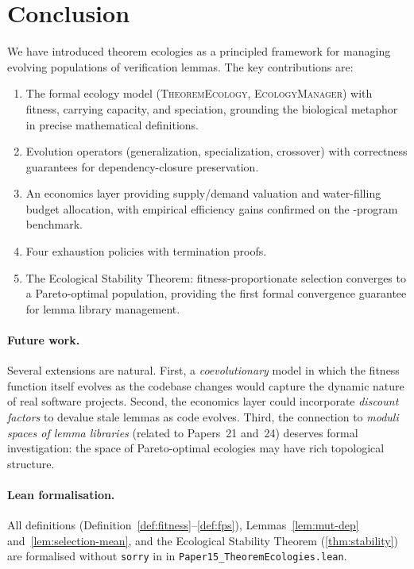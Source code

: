 \documentclass[11pt]{article}
\providecommand{\EcoMgr}{\textsc{EcologyManager}} %
\providecommand{\EcoThm}{\textsc{TheoremEcology}}   %
\begin{document}
\section{Conclusion}\label{sec:conclusion}

We have introduced theorem ecologies as a principled framework for
managing evolving populations of verification lemmas.  The key
contributions are:

\begin{enumerate}[leftmargin=1.5em]
  \item The formal ecology model (\EcoThm{}, \EcoMgr{}) with fitness,
    carrying capacity, and speciation, grounding the biological
    metaphor in precise mathematical definitions.
  \item Evolution operators (generalization, specialization, crossover)
    with correctness guarantees for dependency-closure preservation.
  \item An economics layer providing supply/demand valuation and
    water-filling budget allocation, with empirical efficiency
    gains confirmed on the \expTotalPrograms-program benchmark.
  \item Four exhaustion policies with termination proofs.
  \item The Ecological Stability Theorem: fitness-proportionate
    selection converges to a Pareto-optimal population, providing the
    first formal convergence guarantee for lemma library management.
\end{enumerate}

\paragraph{Future work.}
Several extensions are natural.  First, a \emph{coevolutionary}
model in which the fitness function itself evolves as the codebase
changes would capture the dynamic nature of real software projects.
Second, the economics layer could incorporate \emph{discount factors}
to devalue stale lemmas as code evolves.  Third, the connection to
\emph{moduli spaces of lemma libraries} (related to Papers~21 and~24)
deserves formal investigation: the space of Pareto-optimal ecologies
may have rich topological structure.

\paragraph{Lean formalisation.}
All definitions (Definition~\ref{def:fitness}–\ref{def:fps}),
Lemmas~\ref{lem:mut-dep} and~\ref{lem:selection-mean}, and the
Ecological Stability Theorem (\ref{thm:stability}) are formalised
without \texttt{sorry} in \LEAN{} in
\texttt{Paper15\_TheoremEcologies.lean}.
\end{document}
